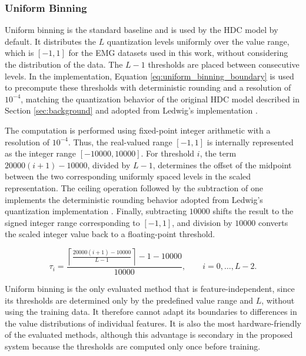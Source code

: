     
        \subsubsection{Uniform Binning}
        \label{sec:UniformBinning}
        Uniform binning is the standard baseline and is used by the HDC model by default. It distributes the $L$ quantization levels uniformly over the value range, which is $[-1,1]$ for the EMG datasets used in this work, without considering the distribution of the data. The $L-1$ thresholds are placed between consecutive levels. In the implementation, Equation \ref{eq:uniform_binning_boundary} is used to precompute these thresholds with deterministic rounding and a resolution of $10^{-4}$, matching the quantization behavior of the original HDC model described in Section \ref{sec:background} and adopted from Ledwig's implementation \cite{ledwig_vdl-implementierung_2025}.

    The computation is performed using fixed-point integer arithmetic with a resolution of \(10^{-4}\). Thus, the real-valued range \([-1,1]\) is internally represented as the integer range \([-10000,10000]\). For threshold $i$, the term \(20000(i+1)-10000\), divided by $L-1$, determines the offset of the midpoint between the two corresponding uniformly spaced levels in the scaled representation. The ceiling operation followed by the subtraction of one implements the deterministic rounding behavior adopted from Ledwig’s quantization implementation \cite{ledwig_vdl-implementierung_2025}. Finally, subtracting \(10000\) shifts the result to the signed integer range corresponding to \([-1,1]\), and division by \(10000\) converts the scaled integer value back to a floating-point threshold.
    
        \begin{equation}
            \tau_i =
            \frac{
                \left\lceil
                    \frac{20000(i+1)-10000}{L-1}
                \right\rceil
                -1-10000
            }{10000},
            \qquad i=0,\ldots,L-2.
        \label{eq:uniform_binning_boundary}
        \end{equation}

        Uniform binning is the only evaluated method that is feature-independent, since its thresholds are determined only by the predefined value range and $L$, without using the training data. It therefore cannot adapt its boundaries to differences in the value distributions of individual features. It is also the most hardware-friendly of the evaluated methods, although this advantage is secondary in the proposed system because the thresholds are computed only once before training.

